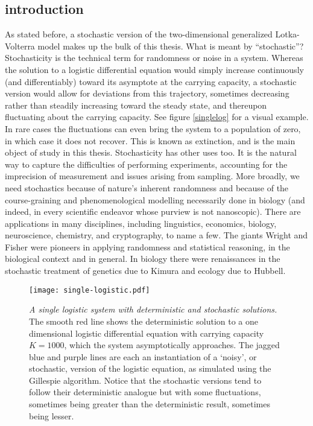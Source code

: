 \subsection{introduction}
As stated before, a stochastic version of the two-dimensional generalized Lotka-Volterra model makes up the bulk of this thesis. 
What is meant by ``stochastic''? 
Stochasticity is the technical term for randomness or noise in a system. 
Whereas the solution to a logistic differential equation would simply increase continuously (and differentiably) toward its asymptote at the carrying capacity, a stochastic version would allow for deviations from this trajectory, sometimes decreasing rather than steadily increasing toward the steady state, and thereupon fluctuating about the carrying capacity. 
See figure \ref{singlelog} for a visual example. 
In rare cases the fluctuations can even bring the system to a population of zero, in which case it does not recover. 
This is known as extinction, and is the main object of study in this thesis. 
Stochasticity has other uses too. 
It is the natural way to capture the difficulties of performing experiments, accounting for the imprecision of measurement and issues arising from sampling. 
More broadly, we need stochastics because of nature's inherent randomness and because of the course-graining and phenomenological modelling necessarily done in biology (and indeed, in every scientific endeavor whose purview is not nanoscopic). %
There are applications in many disciplines, including linguistics, economics, biology, neuroscience, chemistry, and cryptography, to name a few. 
The giants Wright and Fisher were pioneers in applying randomness and statistical reasoning, in the biological context and in general. 
In biology there were renaissances in the stochastic treatment of genetics due to Kimura and ecology due to Hubbell. 
\begin{figure}[h]
	\centering
	\texttt{[image: single-logistic.pdf]}
	\caption{\emph{A single logistic system with deterministic and stochastic solutions.} The smooth red line shows the deterministic solution to a one dimensional logistic differential equation with carrying capacity $K=1000$, which the system asymptotically approaches. The jagged blue and purple lines are each an instantiation of a `noisy', or stochastic, version of the logistic equation, as simulated using the Gillespie algorithm. Notice that the stochastic versions tend to follow their deterministic analogue but with some fluctuations, sometimes being greater than the deterministic result, sometimes being lesser. }
\end{figure} \label{singlelog}

